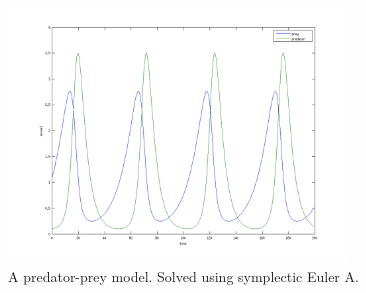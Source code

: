 \begin{figure}[h!]
	\centering
	\includegraphics[width=0.8\textwidth]{img/exc4}
	\caption{A predator-prey model. Solved using symplectic Euler A.}
	\label{fig:exc4}
\end{figure}